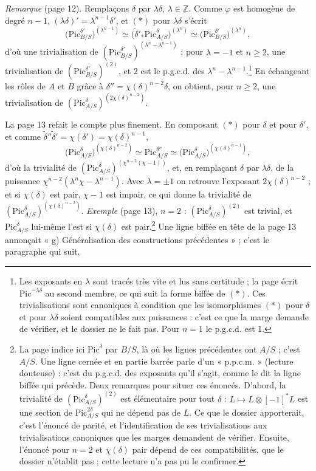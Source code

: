 \documentclass[11pt,a4paper]{article}
\begin{document}
\emph{Remarque} (page 12). Remplaçons $\delta$ par $\lambda\delta$, $\lambda \in \mathbb{Z}$. Comme
$\varphi$ est homogène de degré $n - 1$, $(\lambda\delta)' =
\lambda^{n-1}\delta'$, et $(*)$ pour $\lambda\delta$ s'écrit
\[
\bigl(\mathrm{Pic}^{\delta'}_{B/S}\bigr)^{(\lambda^{n-1})} \simeq
\bigl(\tilde{\delta}'_{*}\mathrm{Pic}^{\delta}_{A/S}\bigr)^{(\lambda^{n})}
\simeq \bigl(\mathrm{Pic}^{\delta'}_{B/S}\bigr)^{(\lambda^{n})},
\]
d'où une trivialisation de $(\mathrm{Pic}^{\delta'}_{B/S})^{(\lambda^{n} -
\lambda^{n-1})}$ ; pour $\lambda = -1$ et $n \geq 2$, une trivialisation de
$(\mathrm{Pic}^{\delta'}_{B/S})^{(2)}$, et $2$ est le p.g.c.d. des
$\lambda^{n} - \lambda^{n-1}$.\footnote{Les exposants en $\lambda$ sont tracés
très vite et lus sans certitude ; la page écrit $\mathrm{Pic}^{-\lambda\delta}$
au second membre, ce qui suit la forme biffée de $(*)$. Ces trivialisations
sont canoniques à condition que les isomorphismes $(*)$ pour $\delta$ et pour
$\lambda\delta$ soient compatibles aux puissances : c'est ce que la marge
demande de vérifier, et le dossier ne le fait pas. Pour $n = 1$ le p.g.c.d. est
$1$.} En échangeant les rôles de $A$ et $B$ grâce à $\delta'' =
\chi(\delta)^{n-2}\delta$, on obtient, pour $n \geq 2$, une trivialisation de
$(\mathrm{Pic}^{\delta}_{A/S})^{(2\chi(\delta)^{n-2})}$.

La page 13 refait le compte plus finement. En composant $(*)$ pour $\delta$ et
pour $\delta'$, et comme $\tilde{\delta}''\tilde{\delta}' = \chi(\delta')
= \chi(\delta)^{n-1}$,
\[
\bigl(\mathrm{Pic}^{\delta}_{A/S}\bigr)^{(\chi(\delta)^{n-2})} \simeq
\mathrm{Pic}^{\delta''}_{A/S} \simeq
\bigl(\mathrm{Pic}^{\delta}_{A/S}\bigr)^{(\chi(\delta)^{n-1})},
\]
d'où la trivialité de $(\mathrm{Pic}^{\delta}_{A/S})^{(\chi^{n-2}(\chi - 1))}$,
et, en remplaçant $\delta$ par $\lambda\delta$, de la puissance
$\chi^{n-2}(\lambda^{n}\chi - \lambda^{n-1})$. Avec $\lambda = \pm 1$ on
retrouve l'exposant $2\chi(\delta)^{n-2}$ ; et si $\chi(\delta)$ est pair,
$\chi - 1$ est impair, ce qui donne la trivialité de
$(\mathrm{Pic}^{\delta}_{A/S})^{(\chi(\delta)^{n-2})}$. \emph{Exemple} (page 13), $n = 2$ :
$(\mathrm{Pic}^{\delta}_{A/S})^{(2)}$ est trivial, et
$\mathrm{Pic}^{\delta}_{A/S}$ lui-même l'est si $\chi(\delta)$ est
pair.\footnote{La page indice ici $\mathrm{Pic}^{\delta}$ par $B/S$, là où les
lignes précédentes ont $A/S$ ; c'est $A/S$. Une ligne cernée et en partie
barrée parle d'un « p.p.c.m. » (lecture douteuse) : c'est du p.g.c.d. des
exposants qu'il s'agit, comme le dit la ligne biffée qui précède. Deux remarques
pour situer ces énoncés. D'abord, la trivialité de
$(\mathrm{Pic}^{\delta}_{A/S})^{(2)}$ est élémentaire pour tout $\delta$ :
$L \mapsto L \otimes [-1]^{*}L$ est une section de
$\mathrm{Pic}^{2\delta}_{A/S}$ qui ne dépend pas de $L$. Ce que le dossier
apporterait, c'est l'énoncé de parité, et l'identification de ses
trivialisations aux trivialisations canoniques que les marges demandent de
vérifier. Ensuite, l'énoncé pour $n = 2$ et $\chi(\delta)$ pair dépend de ces
compatibilités, que le dossier n'établit pas ; cette lecture n'a pas pu le
confirmer.} Une ligne biffée en tête de la page 13 annonçait « g)
Généralisation des constructions précédentes » ; c'est le paragraphe qui
suit.
\end{document}
